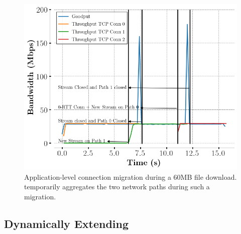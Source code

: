 \begin{figure}[!t]
  \begin{center}
    \includegraphics[width=.8\columnwidth]{figures/migration.png}
  \end{center}
\vspace{-0.5cm}
  \caption{Application-level connection migration during a 60MB file download.
    \tcpls temporarily aggregates the two network paths during such a migration.}
  \label{fig:conn_migration}
\end{figure}

\subsection{Dynamically Extending \tcpls}
%

